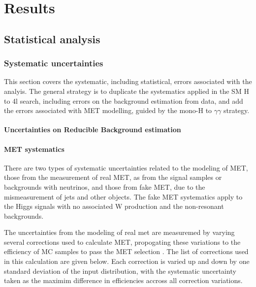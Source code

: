 \chapter{Results}

\section{Statistical analysis}

\subsection{Systematic uncertainties}

This section covers the systematic, including statistical, errors associated with the analyis. The general strategy is to duplicate the systematics applied in the SM H to 4l search, including errors on the background estimation from data, and add the errors associated with MET modelling, guided by the mono-H to $\gamma\gamma$ strategy. 

\subsubsection{Uncertainties on Reducible Background estimation} %
\label{sec:zxUncert}


\subsubsection{MET systematics}\label{sec:metsyst}

There are two types of systematic uncertainties related to the modeling of MET, those from the measurement of real MET, as from the signal samples or backgrounds with neutrinos, and those from fake MET, due to the mismeasurement of jets and other objects. The fake MET systematics apply to the Higgs signals with no associated W production and the non-resonant backgrounds. 

The uncertainties from the modeling of real met are measuremed by varying several corrections used to calculate MET, propogating these variations to the efficiency of MC samples to pass the MET selection \cite{mettwiki}. The list of corrections used in this calculation are given below. Each correction is varied up and down by one standard deviation of the input distribution, with the systematic uncertainty taken as the maximim difference in efficiencies accross all correction variations.

